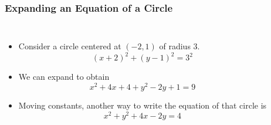 \documentclass[serif,ignorenonframetext]{beamer}
\begin{document}
\begin{frame}
  \frametitle{Expanding an Equation of a Circle}
  \begin{columns}
  \begin{itemize}[<+->]
  \item Consider a circle centered at $(-2,1)$ of radius $3$.
    \begin{equation*}
      (x+2)^2 + (y-1)^2 = 3^2
    \end{equation*}
  \item We can expand to obtain
    \begin{equation*}
      x^2 +4x + 4 + y^2 -2y + 1 = 9
    \end{equation*}
  \item Moving constants, another way to write the equation of that
    circle is 
    \begin{equation*}
      x^2 + y^2 +4x-2y= 4
    \end{equation*}
  \end{itemize}
  \end{columns}
\end{frame}
\end{document}
